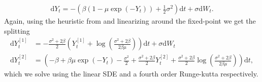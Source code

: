 \begin{align}
    \mathrm{d}Y_t = -\left(\beta\left(1 - \mu\exp(-Y_t)\right) + \frac{1}{2}\sigma^2\right)\mathrm{d}t + \sigma \mathrm{d}W_t.
\end{align}
Again, using the heuristic from \cite{SplittingSchemes} and linearizing around the fixed-point we get the splitting
\begin{align}
    \mathrm{d}Y_t^{[1]} &= - \frac{\sigma^2 + 2\beta}{2}\left(Y_t^{[1]} + \log\left(\frac{\sigma^2 + 2\beta}{2\beta \mu}\right)\right)\mathrm{d}t + \sigma \mathrm{d}W_t\\
    \mathrm{d}Y_t^{[2]} &= \left(-\beta + \beta\mu\exp(-Y_t) - \frac{\sigma^2}{2} + \frac{\sigma^2+2\beta}{2}Y_t^{[2]} + \frac{\sigma^2+2\beta}{2}\log\left(\frac{\sigma^2+2\beta}{2\beta\mu}\right)\right)\mathrm{d}t,
\end{align}
which we solve using the linear SDE and a fourth order Runge-kutta respectively.\\

